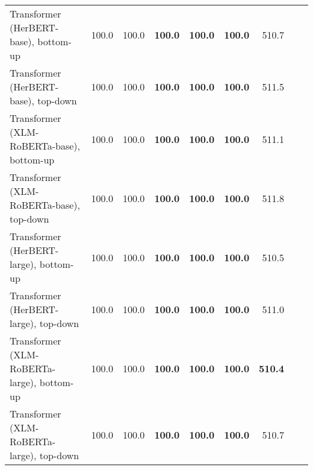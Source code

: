 \begin{table}[ht!]
{\begin{tabular}{lrrrrrrrr}
  Transformer (HerBERT-base), bottom-up & 100.0 & 100.0 & \textbf{100.0} & \textbf{100.0} & \textbf{100.0} & 510.7 \\ 
  Transformer (HerBERT-base), top-down & 100.0 & 100.0 & \textbf{100.0} & \textbf{100.0} & \textbf{100.0} & 511.5 \\ 
  Transformer (XLM-RoBERTa-base), bottom-up & 100.0 & 100.0 & \textbf{100.0} & \textbf{100.0} & \textbf{100.0} & 511.1 \\ 
  Transformer (XLM-RoBERTa-base), top-down & 100.0 & 100.0 & \textbf{100.0} & \textbf{100.0} & \textbf{100.0} & 511.8 \\ 
  Transformer (HerBERT-large), bottom-up & 100.0 & 100.0 & \textbf{100.0} & \textbf{100.0} & \textbf{100.0} & 510.5 \\ 
  Transformer (HerBERT-large), top-down & 100.0 & 100.0 & \textbf{100.0} & \textbf{100.0} & \textbf{100.0} & 511.0 \\ 
  Transformer (XLM-RoBERTa-large), bottom-up & 100.0 & 100.0 & \textbf{100.0} & \textbf{100.0} & \textbf{100.0} & \textbf{510.4} \\ 
  Transformer (XLM-RoBERTa-large), top-down & 100.0 & 100.0 & \textbf{100.0} & \textbf{100.0} & \textbf{100.0} & 510.7 \\ 
   \hline
\end{tabular}
}
\end{table}




